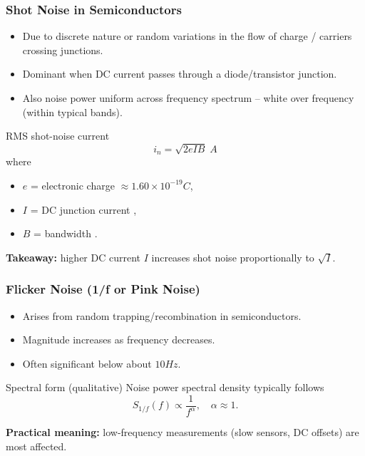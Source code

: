 \begin{frame}
	\frametitle{Shot Noise in Semiconductors}
	\begin{itemize}
		\item Due to discrete nature or random variations in the flow of charge / carriers crossing junctions.
		\item Dominant when DC current passes through a diode/transistor junction.
		\item Also noise power uniform across frequency spectrum -- white over frequency (within typical bands).
	\end{itemize}
	\begin{block}{RMS shot-noise current}
		\begin{equation}
			\boxed{i_n = \sqrt{2 e I B}\;\unit{A}}
		\end{equation}
		where
		\begin{itemize}
			\item $e$ = electronic charge $\approx 1.60\times10^{-19}\unit{C}$,
			\item $I$ = DC junction current \;[\unit{A}],
			\item $B$ = bandwidth \;[\unit{Hz}].
		\end{itemize}
	\end{block}
	\textbf{Takeaway:} higher DC current $I$ increases shot noise proportionally to $\sqrt{I}$.
\end{frame}

\begin{frame}
	\frametitle{Flicker Noise (1/f or Pink Noise)}
	\begin{itemize}
		\item Arises from random trapping/recombination in semiconductors.
		\item Magnitude increases as frequency decreases.
		\item Often significant below about $10\unit{Hz}$.
	\end{itemize}
	\begin{block}{Spectral form (qualitative)}
		Noise power spectral density typically follows
		\begin{equation}
			S_{1/f}(f) \propto \frac{1}{f^{\alpha}},\quad \alpha\approx 1.
		\end{equation}
	\end{block}
	\textbf{Practical meaning:} low-frequency measurements (slow sensors, DC offsets) are most affected.
\end{frame}

